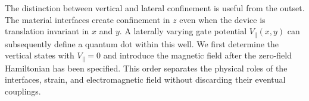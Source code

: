 \documentclass[10pt,letterpaper]{article}
\begin{document}
The distinction between vertical and lateral confinement is useful from the outset. The material interfaces create confinement in $z$ even when the device is translation invariant in $x$ and $y$. A laterally varying gate potential $V_\parallel(x,y)$ can subsequently define a quantum dot within this well. We first determine the vertical states with $V_\parallel=0$ and introduce the magnetic field after the zero-field Hamiltonian has been specified. This order separates the physical roles of the interfaces, strain, and electromagnetic field without discarding their eventual couplings.

\end{document}
